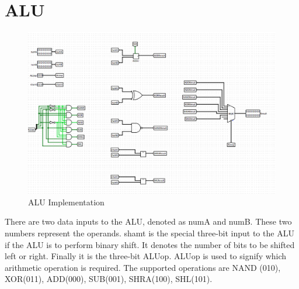 \documentclass{article}
\begin{document}
	\section{ALU}
	\begin{figure}[H]
		\begin{center}
			\includegraphics[scale=0.5]{alu}
			\caption{ALU Implementation}
		\end{center}
	\end{figure}
	There are two data inputs to the ALU, denoted as numA and numB. These two numbers represent the operands. shamt is the special three-bit input to the ALU if the ALU is to perform binary shift. It denotes the number of bits to be shifted left or right. Finally it is the three-bit ALUop. ALUop is used to signify which arithmetic operation is required. The supported operations are NAND (010), XOR(011), ADD(000), SUB(001), SHRA(100), SHL(101).
	\clearpage
\end{document}
